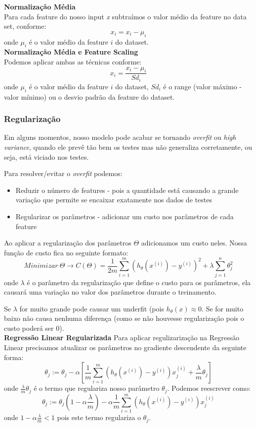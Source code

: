 \documentclass[11pt,a4paper,leqno]{article}
\begin{document}
\textbf{Normalização Média}\\
Para cada feature do nosso input \emph{x} subtraímos o valor médio da feature no data set, conforme:
\[
x_i = x_i - \mu_i
\]
onde $\mu_i$ é o valor médio da feature $i$ do dataset.
\\

\textbf{Normalização Média e Feature Scaling}\\
Podemos aplicar ambas as técnicas conforme:
\[
x_i = \frac{x_i - \mu_i}{Sd_i}
\]
onde $\mu_i$ é o valor médio da feature $i$ do dataset, $Sd_i$ é o range (valor máximo - valor mínimo) ou o desvio padrão da feature do dataset.



\subsubsection{Regularização}
Em alguns momentos, nosso modelo pode acabar se tornando \emph{overfit} ou \emph{high variance}, quando ele prevê tão bem os testes mas não generaliza corretamente, ou seja, está viciado nos testes.

Para resolver/evitar o \emph{overfit} podemos:
\begin{itemize}
\item Reduzir o número de features - pois a quantidade está causando a grande variação que permite se encaixar exatamente nos dados de testes
\item Regularizar os parâmetros - adicionar um custo nos parâmetros de cada feature
\end{itemize}

Ao aplicar a regularização dos parâmetros $\Theta$ adicionamos um custo neles.
Nossa função de custo fica no seguinte formato:
\[
Minimizar \ \Theta \rightarrow C (\Theta) = \frac{1}{2m} \sum_{i=1}^m ( h_\theta (x^{(i)}) - y^{(i)}) ^ 2 + \lambda \sum_{j=1}^n \theta_j^2
\]
onde $\lambda$ é o parâmetro da regularização que define o custo para os parâmetros, ela causará uma variação no valor dos parâmetros durante o treinamento.

Se $\lambda$ for muito grande pode causar um underfit (pois $h_\theta (x) \approx 0$. Se for muito baixo não causa nenhuma diferença (como se não houvesse regularização pois o custo poderá ser 0).\\


\textbf{Regressão Linear Regularizada}
Para aplicar regulizarização na Regressão Linear precisamos atualizar os parâmetros no gradiente descendente da seguinte forma:
\[
\theta_j := \theta_j - \alpha	 \left[ \frac{1}{m} \sum_{i=1}^m ( h_\theta(x^{(i)}) - y^{(i)})x_j^{(i)} + \frac{\lambda}{m} \theta_j \right]
\]
onde $\frac{\lambda}{m} \theta_j$ é o termo que regulariza nosso parâmetro $\theta_j$.
Podemos reescrever como:
\[
\theta_j := \theta_j (1 - \alpha \frac{\lambda}{m}) - \alpha	 \frac{1}{m} \sum_{i=1}^m ( h_\theta(x^{(i)}) - y^{(i)})x_j^{(i)}
\]
onde $1 - \alpha \frac{\lambda}{m} < 1$ pois este termo regulariza o $\theta_j$.
\end{document}
